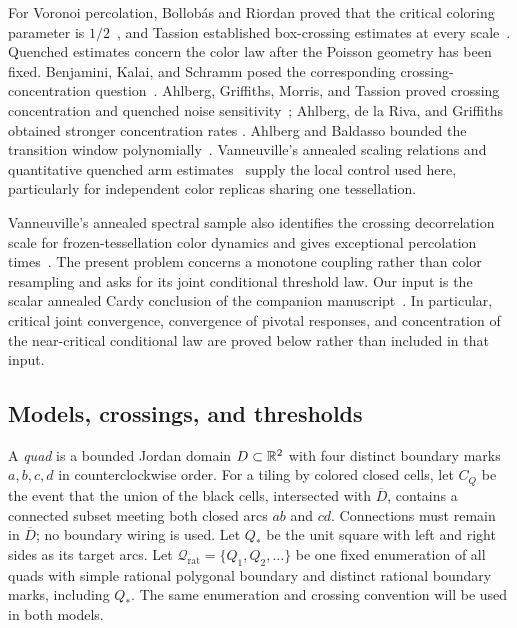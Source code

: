 For Voronoi percolation, Bollob\'as and Riordan proved that the critical
coloring parameter is $1/2$~\cite{bollobasriordan06}, and Tassion
established box-crossing estimates at every scale~\cite{tassion16}.
Quenched estimates concern the color law after the Poisson geometry
has been fixed. Benjamini, Kalai, and Schramm posed the corresponding
crossing-concentration question~\cite[Section~5.1]{bks99}.
Ahlberg, Griffiths, Morris, and Tassion proved crossing
concentration and quenched noise sensitivity~\cite{agmt16}; Ahlberg,
de la Riva, and Griffiths obtained stronger concentration rates
\cite{ahlberg-riva-griffiths21}. Ahlberg and Baldasso bounded the
transition window polynomially~\cite{ahlbergbaldasso18}.
Vanneuville's annealed scaling relations and quantitative quenched
arm estimates~\cite{vanneuville-scaling,vanneuville-quantitative}
supply the local control used here, particularly for independent
color replicas sharing one tessellation.

Vanneuville's annealed spectral sample also identifies the crossing
decorrelation scale for frozen-tessellation color dynamics and gives
exceptional percolation times~\cite{vanneuville-spectral}.
The present problem concerns a monotone coupling rather than color
resampling and asks for its joint conditional threshold law.
Our input is the scalar annealed Cardy conclusion of the companion
manuscript~\cite[Theorem~1.1]{supplied-cardy}.
In particular, critical joint convergence, convergence of pivotal
responses, and concentration of the near-critical conditional law
are proved below rather than included in that input.

\subsection{Models, crossings, and thresholds}

A \emph{quad} is a bounded Jordan domain $D\subset\mathbb R^2$ with four
distinct boundary marks $a,b,c,d$ in counterclockwise order. For a
tiling by colored closed cells, let $C_Q$ be the event that the union
of the black cells, intersected with $\overline D$, contains a connected
subset meeting both closed arcs $ab$ and $cd$. Connections must remain
in $\overline D$; no boundary wiring is used. Let $Q_*$ be the unit
square with left and right sides as its target arcs. Let
$\mathcal Q_{\mathrm{rat}}=\{Q_1,Q_2,\ldots\}$ be one fixed enumeration
of all quads with simple rational polygonal boundary and distinct
rational boundary marks, including $Q_*$. The same enumeration and
crossing convention will be used in both models.

